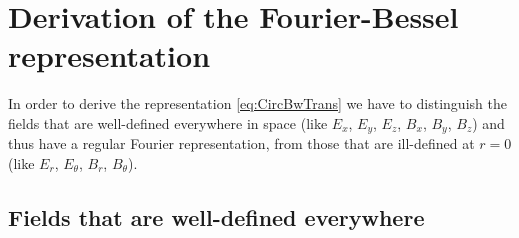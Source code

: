 
\section{Derivation of the Fourier-Bessel representation}
\label{sec:CircTrans}

In order to derive the representation \cref{eq:CircBwTrans} we have to
distinguish the fields that are well-defined everywhere in space (like
$E_x$, $E_y$, $E_z$, $B_x$, $B_y$, $B_z$) and thus have a regular
Fourier representation, from those that are ill-defined at $r=0$ (like $E_r$, $E_\theta$, $B_r$, $B_\theta$).

\subsection{Fields that are well-defined everywhere}

